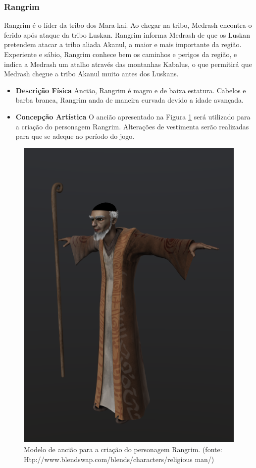 \subsubsection{Rangrim}
Rangrim é o líder da tribo dos Mara-kai. Ao chegar na tribo, Medrash
 encontra-o ferido após ataque da tribo Luskan. Rangrim informa Medrash de
 que os Luskan pretendem atacar a tribo aliada Akanul, a maior e mais
 importante da região. Experiente e sábio, Rangrim conhece bem os caminhos
 e perigos da região, e indica a Medrash um atalho através das montanhas
 Kabalus, o que permitirá que Medrash chegue a tribo Akanul muito antes dos
 Luskans.
\begin{itemize}
\item {\bf Descrição Física}
Ancião, Rangrim é magro e de baixa estatura. Cabelos e barba branca,
 Rangrim anda de maneira curvada devido a idade avançada.
\item {\bf Concepção Artística}
O ancião apresentado na Figura \ref{img:rangrim} será utilizado para a criação
 do personagem Rangrim. Alterações de vestimenta serão realizadas para que
 se adeque ao período do jogo.

\end{itemize}
\begin{figure}[H]
 \centering
 \includegraphics[scale=0.5]{Imagens/rangrim01.png}
 \caption{Modelo de ancião para a criação do personagem Rangrim. (fonte: Htp://www.blendswap.com/blends/characters/religious man/)}
\label{img:rangrim}
\end{figure}

